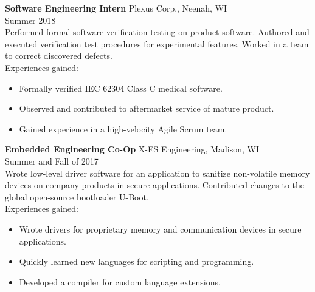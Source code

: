 \documentclass[11pt]{article}
\begin{document}
\vspace{12pt}
\textbf{Software Engineering Intern}
\hfill
Plexus Corp., Neenah, WI\\
Summer 2018\\
Performed formal software verification testing on product software. Authored
and executed verification test procedures for experimental features. Worked in
a team to correct discovered defects.\\
Experiences gained:
\begin{itemize}
\item Formally verified IEC 62304 Class C medical software.
\item Observed and contributed to aftermarket service of mature product.
\item Gained experience in a high-velocity Agile Scrum team.
\end{itemize}

\vspace{12pt}
\textbf{Embedded Engineering Co-Op}
\hfill
X-ES Engineering, Madison, WI\\
Summer and Fall of 2017\\
Wrote low-level driver software for an application to sanitize non-volatile
memory devices on company products in secure applications. Contributed changes
to the global open-source bootloader U-Boot.\\
Experiences gained:
\begin{itemize}
\item Wrote drivers for proprietary memory and communication devices in secure
  applications.
\item Quickly learned new languages for scripting and programming.
\item Developed a compiler for custom language extensions.
\end{itemize}

\end{document}
